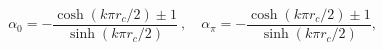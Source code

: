\begin{equation} 
	\alpha_0=-\frac{\cosh(k\pi r_{c}/2)\pm 1}{\sinh(k\pi r_{c}/2)}\ ,\quad	\alpha_\pi=-\frac{\cosh(k\pi r_{c}/2)\pm 1}{\sinh(k\pi r_{c}/2)},
      \end{equation} 

